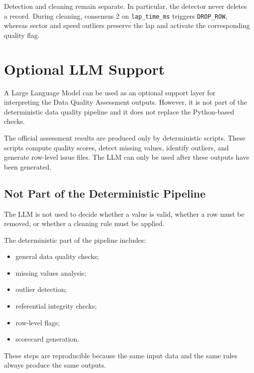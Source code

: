 \documentclass[a4paper,11pt]{article}
\begin{document}
	Detection and cleaning remain separate. In particular, the detector never deletes a
	record. During cleaning, consensus 2 on \texttt{lap\_time\_ms} triggers
	\texttt{DROP\_ROW}, whereas sector and speed outliers preserve the lap and activate
	the corresponding quality flag.



	\section{Optional LLM Support}
	
	A Large Language Model can be used as an optional support layer for interpreting the
	Data Quality Assessment outputs. However, it is not part of the deterministic data quality
	pipeline and it does not replace the Python-based checks.
	
	The official assessment results are produced only by deterministic scripts. These scripts
	compute quality scores, detect missing values, identify outliers, and generate row-level
	issue files. The LLM can only be used after these outputs have been generated.
	
	\subsection{Not Part of the Deterministic Pipeline}
	
	The LLM is not used to decide whether a value is valid, whether a row must be removed,
	or whether a cleaning rule must be applied.
	
	The deterministic part of the pipeline includes:
	
	\begin{itemize}
		\item general data quality checks;
		\item missing values analysis;
		\item outlier detection;
		\item referential integrity checks;
		\item row-level flags;
		\item scorecard generation.
	\end{itemize}
	
	These steps are reproducible because the same input data and the same rules always
	produce the same outputs.
	
\end{document}
